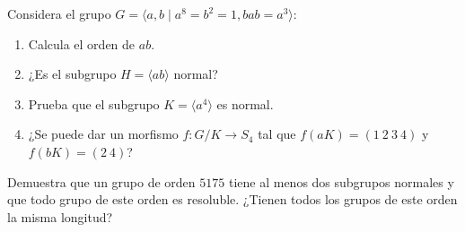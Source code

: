 \documentclass[12pt]{article}
\begin{document}
    \begin{ejercicio}[2.5 puntos]
        Considera el grupo $G=\langle a,b\mid a^8 = b^2 = 1, bab = a^3 \rangle $:
        \begin{enumerate}
            \item Calcula el orden de $ab$.
            \item ¿Es el subgrupo $H = \langle ab \rangle $ normal?
            \item Prueba que el subgrupo $K = \langle a^4 \rangle $ es normal.
            \item ¿Se puede dar un morfismo $f:G/K\to S_4$ tal que $f(aK)=(1\ 2\ 3\ 4)$ y $f(bK) = (2\ 4)$?
        \end{enumerate}
    \end{ejercicio}

    \begin{ejercicio}[2.5 puntos]
        Demuestra que un grupo de orden $5175$ tiene al menos dos subgrupos normales y que todo grupo de este orden es resoluble. ¿Tienen todos los grupos de este orden la misma longitud?
    \end{ejercicio}
\end{document}
